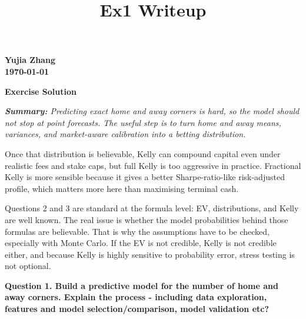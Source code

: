\documentclass{article}
\title{Ex1 Writeup}
\author{}
\date{}
\begin{document}
\begin{flushright}
    \textbf{\small Yujia Zhang \\
    \today}
\end{flushright}

\begin{center}
    \textbf{\large Exercise Solution}
\end{center}

\begin{flushleft}
\vspace{0.3cm}

{\itshape
\textbf{Summary:} Predicting exact home and away corners is hard, so the model should not stop at point forecasts. The useful step is to turn home and away means, variances, and market-aware calibration into a betting distribution.

\par\vspace{0.25cm}

Once that distribution is believable, Kelly can compound capital even under realistic fees and stake caps, but full Kelly is too aggressive in practice. Fractional Kelly is more sensible because it gives a better Sharpe-ratio-like risk-adjusted profile, which matters more here than maximising terminal cash.

\par\vspace{0.25cm}

Questions 2 and 3 are standard at the formula level: EV, distributions, and Kelly are well known. The real issue is whether the model probabilities behind those formulas are believable. That is why the assumptions have to be checked, especially with Monte Carlo. If the EV is not credible, Kelly is not credible either, and because Kelly is highly sensitive to probability error, stress testing is not optional.

}

\vspace{0.45cm}
\end{flushleft}

\noindent \textbf{Question 1. Build a predictive model for the number of home and away corners. Explain the process -
including data exploration, features and model selection/comparison, model validation etc?}
\end{document}
